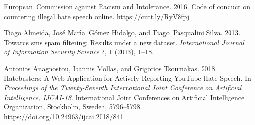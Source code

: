 \documentclass[sigconf]{acmart}
\begin{document}
\begin{thebibliography}{50}



\ifx \showCODEN    \undefined {}     \fi
\ifx \showDOI      \undefined \def \showDOI       #1{#1}\fi
\ifx \showISBNx    \undefined \def \showISBNx     #1{\unskip}     \fi
\ifx \showISBNxiii \undefined \def \showISBNxiii  #1{\unskip}     \fi
\ifx \showISSN     \undefined \def \showISSN      #1{\unskip}     \fi
\ifx \showLCCN     \undefined \def \showLCCN      #1{\unskip}     \fi
\ifx \shownote     \undefined \def \shownote      #1{#1}          \fi
\ifx \showarticletitle \undefined \def \showarticletitle #1{#1}   \fi
\ifx \showURL      \undefined \def \showURL       {\relax}        \fi
\providecommand\bibfield[2]{#2}
\providecommand\bibinfo[2]{#2}
\providecommand\natexlab[1]{#1}
\providecommand\showeprint[2][]{arXiv:#2}

\bibfield{author}{\bibinfo{person}{European~Commission against Racism} {and}
  \bibinfo{person}{Intolerance}.} \bibinfo{year}{2016}\natexlab{}.
\newblock \bibinfo{title}{Code of conduct on countering illegal hate speech
  online}.
\newblock
\newblock
\urldef\tempurl \url{https://cutt.ly/RyV8fpj}
\showURL{\tempurl}


\bibfield{author}{\bibinfo{person}{Tiago Almeida}, \bibinfo{person}{Jos{\'e}
  Mar{\'\i}a~G{\'o}mez Hidalgo}, {and} \bibinfo{person}{Tiago~Pasqualini
  Silva}.} \bibinfo{year}{2013}\natexlab{}.
\newblock \showarticletitle{Towards sms spam filtering: Results under a new
  dataset}.
\newblock \bibinfo{journal}{\emph{International Journal of Information Security
  Science}} \bibinfo{volume}{2}, \bibinfo{number}{1} (\bibinfo{year}{2013}),
  \bibinfo{pages}{1--18}.
\newblock


\bibfield{author}{\bibinfo{person}{Antonios Anagnostou},
  \bibinfo{person}{Ioannis Mollas}, {and} \bibinfo{person}{Grigorios
  Tsoumakas}.} \bibinfo{year}{2018}\natexlab{}.
\newblock \showarticletitle{Hatebusters: A Web Application for Actively
  Reporting YouTube Hate Speech}. In \bibinfo{booktitle}{\emph{Proceedings of
  the Twenty-Seventh International Joint Conference on Artificial Intelligence,
  {IJCAI-18}}}. \bibinfo{publisher}{International Joint Conferences on
  Artificial Intelligence Organization}, \bibinfo{address}{Stockholm, Sweden},
  \bibinfo{pages}{5796--5798}.
\newblock
\urldef\tempurl \url{https://doi.org/10.24963/ijcai.2018/841}
\showDOI{\tempurl}



\end{thebibliography}
\end{document}
